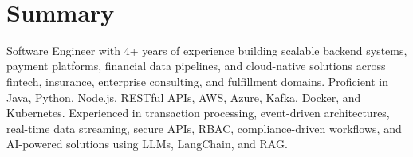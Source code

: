 \documentclass[10pt]{article}
\begin{document}
\begin{center}
   \\
  \vspace{1pt}
\end{center}
\vspace{-4pt}

\section{Summary}
\footnotesize{
Software Engineer with 4+ years of experience building scalable backend systems, payment platforms, financial data pipelines, and cloud-native solutions across fintech, insurance, enterprise consulting, and fulfillment domains. Proficient in Java, Python, Node.js, RESTful APIs, AWS, Azure, Kafka, Docker, and Kubernetes. Experienced in transaction processing, event-driven architectures, real-time data streaming, secure APIs, RBAC, compliance-driven workflows, and AI-powered solutions using LLMs, LangChain, and RAG.
}
\vspace{-1pt}
\end{document}
